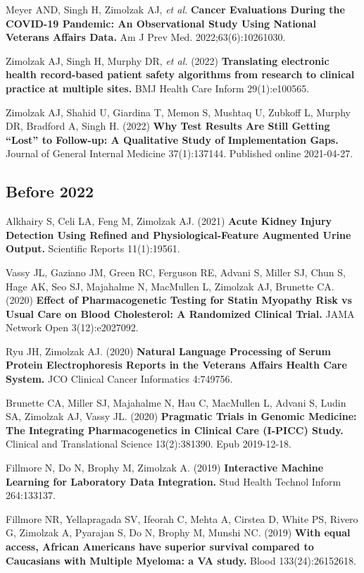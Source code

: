 \documentclass[10pt]{article}
\begin{document}
Meyer AND, Singh H, Zimolzak AJ, \emph{et al.} \textbf{Cancer
  Evaluations During the COVID-19 Pandemic: An Observational Study
  Using National Veterans Affairs Data.} Am J Prev Med.
2022;63(6):1026\ndash{}1030.

Zimolzak AJ, Singh H, Murphy DR, \emph{et al.} (2022)
\textbf{Translating electronic health record-based patient safety
  algorithms from research to clinical practice at multiple sites.}
BMJ Health Care Inform 29(1):e100565.

Zimolzak AJ, Shahid U, Giardina T, Memon S, Mushtaq U, Zubkoff L,
Murphy DR, Bradford A, Singh H. (2022) \textbf{Why Test Results Are
  Still Getting ``Lost'' to Follow-up: A Qualitative Study of
  Implementation Gaps.} Journal of General Internal Medicine
37(1):137\ndash{}144. Published online 2021-04-27.

\subsection*{Before 2022}

Alkhairy S, Celi LA, Feng M, Zimolzak AJ. (2021) \textbf{Acute Kidney
  Injury Detection Using Refined and Phys\-i\-o\-log\-i\-cal-Fea\-ture
  Augmented Urine Output.} Scientific Reports 11(1):19561.

Vassy JL, Gaziano JM, Green RC, Ferguson RE, Advani S, Miller SJ, Chun
S, Hage AK, Seo SJ, Majahalme N, MacMullen L, Zimolzak AJ, Brunette
CA. (2020) \textbf{Effect of Pharmacogenetic Testing for Statin
  Myopathy Risk vs Usual Care on Blood Cholesterol: A Randomized
  Clinical Trial.} JAMA Network Open 3(12):e2027092.

Ryu JH, Zimolzak AJ. (2020) \textbf{Natural Language Processing of
  Serum Protein Electrophoresis Reports in the Veterans Affairs Health
  Care System.} JCO Clinical Cancer Informatics 4:749\ndash{}756.

Brunette CA, Miller SJ, Majahalme N, Hau C, MacMullen L, Advani S,
Ludin SA, Zimolzak AJ, Vassy JL. (2020) \textbf{Pragmatic Trials in
  Genomic Medicine: The Integrating Pharmacogenetics in Clinical Care
  (I-PICC) Study.} Clinical and Translational Science
13(2):381\ndash{}390. Epub 2019-12-18.

Fillmore N, Do N, Brophy M, Zimolzak A. (2019) \textbf{Interactive
  Machine Learning for Laboratory Data Integration.} Stud Health
Technol Inform 264:133\ndash{}137.

Fillmore NR, Yellapragada SV, Ifeorah C, Mehta A, Cirstea D, White PS,
Rivero G, Zimolzak A, Pyarajan S, Do N, Brophy M, Munshi NC. (2019)
\textbf{With equal access, African Americans have superior survival
  compared to Caucasians with Multiple Myeloma: a VA study.} Blood
133(24):2615\ndash{}2618.
\end{document}
